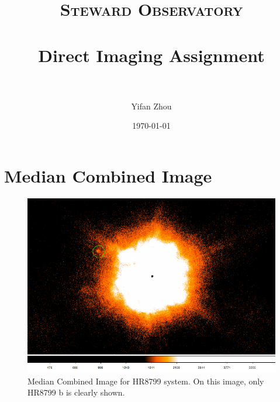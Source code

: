 \documentclass[paper=letter, fontsize=11pt]{scrartcl} %
\title{ 
\normalfont \normalsize 
\textsc{Steward Observatory} \\ [25pt] %
\horrule{0.5pt} \\[0.4cm] %
\huge Direct Imaging Assignment \\ %
\horrule{2pt} \\[0.5cm] %
}
\author{Yifan Zhou} %
\date{\normalsize\today} %
\numberwithin{equation}{section} %
\numberwithin{figure}{section} %
\numberwithin{table}{section} %
\begin{document}
\maketitle %
\section{Median Combined Image}
\begin{figure}[!h]
  \centering
  \includegraphics[width=\textwidth]{median}
  \caption{Median Combined Image for HR8799 system. On this image,
    only HR8799 b is clearly shown.}
  \label{fig:median}
\end{figure}
\end{document}
